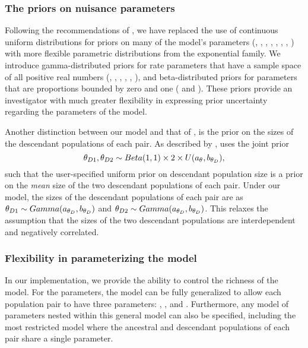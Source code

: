 \subsubsection*{The priors on nuisance parameters}
Following the recommendations of \citet{Oaks2012}, we have replaced the use of
continuous uniform distributions for priors on many of the
model's parameters (\divTime{}, \ancestralTheta{}, ,
, , ,
\recombinationRate, \migrationRate{}) with more flexible parametric
distributions from the exponential family.
We introduce gamma-distributed priors for rate parameters that have a sample
space of all positive real numbers (\divTime{}, \ancestralTheta{},
, , \recombinationRate,
\migrationRate{}), and beta-distributed priors for parameters that are
proportions bounded by zero and one ( and
).
These priors provide an investigator with much greater flexibility in
expressing prior uncertainty regarding the parameters of the model.

Another distinction between our model and that of \msb, is the prior on the
sizes of the descendant populations of each pair.
As described by \citet{Oaks2012}, \msb uses the joint prior
\begin{equation}
    \descendantTheta{1}{}, \descendantTheta{2}{} \sim
    Beta(1,1) \times 2 \times U(\uniformMin{\myTheta{}},
    \uniformMax{\descendantTheta{}{}}),
    \label{eq:jointThetaPrior}
\end{equation}
such that the user-specified uniform prior on descendant population
size is a prior on the \emph{mean} size of the two descendant
populations of each pair.
Under our model, the sizes of the descendant populations of each
pair are \iid as
$\descendantTheta{1}{} \sim Gamma(\gammaShape{\descendantTheta{}{}},
\gammaScale{\descendantTheta{}{}})$
and
$\descendantTheta{2}{} \sim Gamma(\gammaShape{\descendantTheta{}{}},
\gammaScale{\descendantTheta{}{}})$.
This relaxes the assumption that the sizes of the two descendant populations
are interdependent and negatively correlated.

\subsubsection*{Flexibility in parameterizing the model}
In our implementation, we provide the ability to control the richness of the
model.
For the \myTheta{} parameters, the model can be fully generalized to
allow each population pair to have three parameters:
\ancestralTheta{}, , and .
Furthermore, any model of \myTheta{} parameters nested within this
general model can also be specified, including the most restricted model
where the ancestral and descendant populations of each pair share
a single \myTheta{} parameter.

